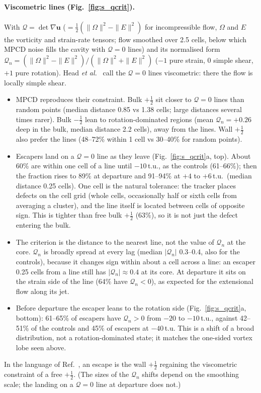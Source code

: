 \documentclass[aps,prl,onecolumn,superscriptaddress,amsmath,amssymb,nofootinbib]{revtex4-2}
\newcommand{\half}{\tfrac12}
\begin{document}
\paragraph{Viscometric lines (Fig.~\ref{fig:s_qcrit}).} With $\mathcal Q=\det\nabla\mathbf u$ ($=\half(\|\Omega\|^2-\|E\|^2)$ for incompressible flow, $\Omega$ and $E$ the vorticity and strain-rate tensors; flow
smoothed over 2.5 cells, below which MPCD noise fills the cavity with $\mathcal Q=0$ lines) and its normalised form $\mathcal Q_n=(\|\Omega\|^2-\|E\|^2)/(\|\Omega\|^2+\|E\|^2)$
($-1$ pure strain, 0 simple shear, $+1$ pure rotation). Head \emph{et al.}~\cite{Head2024} call the $\mathcal Q=0$ lines viscometric: there the flow is locally simple shear.
\begin{itemize}
  \item MPCD reproduces their constraint. Bulk $+\half$ sit closer to $\mathcal Q=0$ lines than random points (median distance 0.85 vs 1.38 cells; large distances several times rarer).
        Bulk $-\half$ lean to rotation-dominated regions (mean $\mathcal Q_n=+0.26$ deep in the bulk, median distance 2.2 cells), away from the lines. Wall $+\half$ also prefer the lines (48--72\% within 1 cell vs 30--40\% for random points).
  \item Escapers land on a $\mathcal Q=0$ line as they leave (Fig.~\ref{fig:s_qcrit}a, top). About 60\% are within one cell of a line until $-10$\,t.u., as the controls (61--66\%);
        then the fraction rises to 89\% at departure and 91--94\% at $+4$ to $+6$\,t.u.\ (median distance 0.25 cells). One cell is the natural tolerance: the tracker places defects on the cell grid (whole cells, occasionally half or sixth cells
        from averaging a cluster), and the line itself is located between cells of opposite sign. This is tighter than free bulk $+\half$ (63\%),
        so it is not just the defect entering the bulk.
  \item The criterion is the distance to the nearest line, not the value of $\mathcal Q_n$ at the core. $\mathcal Q_n$ is broadly spread at every lag (median $|\mathcal Q_n|$ 0.3--0.4, also
        for the controls), because it changes sign within about a cell across a line: an escaper 0.25 cells from a line still has $|\mathcal Q_n|\approx0.4$ at its core. At departure it sits
        on the strain side of the line (64\% have $\mathcal Q_n<0$), as expected for the extensional flow along its jet.
  \item Before departure the escaper leans to the rotation side (Fig.~\ref{fig:s_qcrit}a, bottom): 61--65\% of escapers have $\mathcal Q_n>0$ from $-20$ to $-10$\,t.u., against 42--51\% of the controls
        and 45\% of escapers at $-40$\,t.u. This is a shift of a broad distribution, not a rotation-dominated state; it matches the one-sided vortex lobe seen above.
\end{itemize}
In the language of Ref.~\cite{Head2024}, an escape is the wall $+\half$ regaining the viscometric constraint of a free $+\half$. (The sizes of the $\mathcal Q_n$ shifts depend on the smoothing scale;
the landing on a $\mathcal Q=0$ line at departure does not.)
\end{document}
